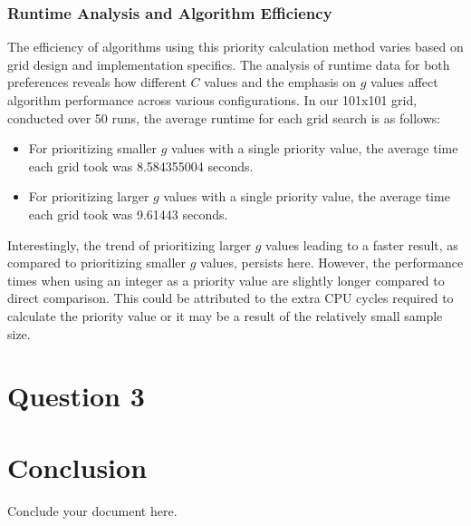 \documentclass{article}
\begin{document}
\subsubsection{Runtime Analysis and Algorithm Efficiency}
The efficiency of algorithms using this priority calculation method varies based on grid design and implementation specifics. The analysis of runtime data for both preferences reveals how different \(C\) values and the emphasis on \(g\) values affect algorithm performance across various configurations. In our 101x101 grid, conducted over 50 runs, the average runtime for each grid search is as follows:
\begin{itemize}
    \item For prioritizing smaller \(g\) values with a single priority value, the average time each grid took was 8.584355004 seconds.
    \item For prioritizing larger \(g\) values with a single priority value, the average time each grid took was 9.61443 seconds.
\end{itemize}
Interestingly, the trend of prioritizing larger \(g\) values leading to a faster result, as compared to prioritizing smaller \(g\) values, persists here. However, the performance times when using an integer as a priority value are slightly longer compared to direct comparison. This could be attributed to the extra CPU cycles required to calculate the priority value or it may be a result of the relatively small sample size. 






\section{Question 3}
\section{Conclusion}
Conclude your document here.
\end{document}
